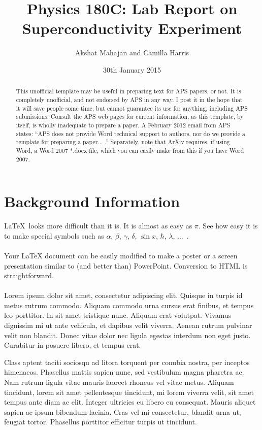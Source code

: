 \documentclass[aps,11pt, twocolumn]{revtex4-1}
\begin{document}
\title{Physics 180C: Lab Report on Superconductivity Experiment}
\author{Akshat Mahajan and Camilla Harris}

\date{30th January 2015}

\begin{abstract}
This unofficial template may be useful in preparing text for APS papers, or not.  It is completely unofficial, and not endorsed by APS in any way.  I post it in the hope that it will save people some time, but cannot guarantee its use for anything, including APS submissions.  Consult the APS web pages for current information, as this template, by itself, is wholly inadequate to prepare a paper.  A February 2012 email from APS states: “APS does not provide Word technical support to authors, nor do we provide a template for preparing a paper... .”  Separately, note that ArXiv requires, if using Word, a Word 2007 *.docx file, which you can easily make from this if you have Word 2007.
\end{abstract}

{\let\newpage\relax\maketitle} 

\section{Background Information}
\LaTeX\ looks more difficult than it is. It is
almost as easy as $\pi$. See how easy it is to make special
symbols such as $\alpha$,
$\beta$, $\gamma$,
$\delta$, $\sin x$, $\hbar$, $\lambda$, $\ldots$\ .\\
\\
Your LaTeX document can be easily modified to make a poster or a screen
presentation similar to (and better than) PowerPoint. Conversion to HTML is
straightforward.\\
\\
Lorem ipsum dolor sit amet, consectetur adipiscing elit. Quisque in turpis id metus rutrum commodo. Aliquam commodo urna cursus erat finibus, et tempus leo porttitor. In sit amet tristique nunc. Aliquam erat volutpat. Vivamus dignissim mi ut ante vehicula, et dapibus velit viverra. Aenean rutrum pulvinar velit non blandit. Donec vitae dolor nec ligula egestas interdum non eget justo. Curabitur in posuere libero, et tempus erat.

Class aptent taciti sociosqu ad litora torquent per conubia nostra, per inceptos himenaeos. Phasellus mattis sapien nunc, sed vestibulum magna pharetra ac. Nam rutrum ligula vitae mauris laoreet rhoncus vel vitae metus. Aliquam tincidunt, lorem sit amet pellentesque tincidunt, mi lorem viverra velit, sit amet tempus ante diam ac elit. Integer ultricies eu libero eu consequat. Mauris aliquet sapien ac ipsum bibendum lacinia. Cras vel mi consectetur, blandit urna ut, feugiat tortor. Phasellus porttitor efficitur turpis ut tincidunt.
\end{document}
